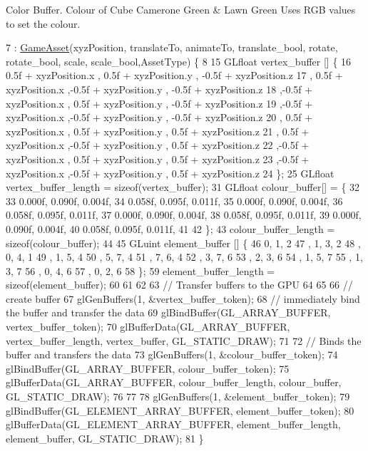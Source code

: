 Color Buffer. Colour of Cube Camerone Green \& Lawn Green Uses R\+G\+B values to set the colour.
\begin{DoxyCode}
7 : \hyperlink{class_game_asset_a9de932075d9b4263e7fb24fbfd163a61}{GameAsset}(xyzPosition, translateTo, animateTo, translate\_bool, rotate, rotate\_bool, scale, 
      scale\_bool,AssetType) \{
8 
15   GLfloat vertex\_buffer [] \{
16       0.5f + xyzPosition.x  , 0.5f + xyzPosition.y  , -0.5f + xyzPosition.z
17     , 0.5f + xyzPosition.x  ,-0.5f + xyzPosition.y  , -0.5f + xyzPosition.z
18     ,-0.5f + xyzPosition.x  , 0.5f + xyzPosition.y  , -0.5f + xyzPosition.z
19     ,-0.5f + xyzPosition.x  ,-0.5f + xyzPosition.y  , -0.5f + xyzPosition.z
20     , 0.5f + xyzPosition.x  , 0.5f + xyzPosition.y  ,  0.5f + xyzPosition.z
21     , 0.5f + xyzPosition.x  ,-0.5f + xyzPosition.y  ,  0.5f + xyzPosition.z
22     ,-0.5f + xyzPosition.x  , 0.5f + xyzPosition.y  ,  0.5f + xyzPosition.z
23     ,-0.5f + xyzPosition.x  ,-0.5f + xyzPosition.y  ,  0.5f + xyzPosition.z
24   \};
25   GLfloat vertex\_buffer\_length = \textcolor{keyword}{sizeof}(vertex\_buffer);
31   GLfloat colour\_buffer[] = \{
32 
33      0.000f, 0.090f, 0.004f, 
34      0.058f, 0.095f, 0.011f,
35      0.000f, 0.090f, 0.004f,
36      0.058f, 0.095f, 0.011f,
37      0.000f, 0.090f, 0.004f,
38      0.058f, 0.095f, 0.011f,
39      0.000f, 0.090f, 0.004f,
40      0.058f, 0.095f, 0.011f,
41 
42   \};
43  colour\_buffer\_length = \textcolor{keyword}{sizeof}(colour\_buffer);
44   
45   GLuint element\_buffer []  \{
46       0, 1, 2   
47     , 1, 3, 2
48     , 0, 4, 1   
49     , 1, 5, 4   
50     , 5, 7, 4   
51     , 7, 6, 4   
52     , 3, 7, 6   
53     , 2, 3, 6   
54     , 1, 5, 7   
55     , 1, 3, 7   
56     , 0, 4, 6   
57     , 0, 2, 6   
58   \};
59   element\_buffer\_length = \textcolor{keyword}{sizeof}(element\_buffer);
60 
61 
62 
63   \textcolor{comment}{// Transfer buffers to the GPU}
64 
65 
66   \textcolor{comment}{// create buffer}
67   glGenBuffers(1, &vertex\_buffer\_token);
68   \textcolor{comment}{// immediately bind the buffer and transfer the data}
69   glBindBuffer(GL\_ARRAY\_BUFFER, vertex\_buffer\_token);
70   glBufferData(GL\_ARRAY\_BUFFER, vertex\_buffer\_length, vertex\_buffer, GL\_STATIC\_DRAW);
71 
72   \textcolor{comment}{// Binds the buffer and transfers the data}
73   glGenBuffers(1, &colour\_buffer\_token);
74   glBindBuffer(GL\_ARRAY\_BUFFER, colour\_buffer\_token);
75   glBufferData(GL\_ARRAY\_BUFFER, colour\_buffer\_length, colour\_buffer, GL\_STATIC\_DRAW);
76 
77 
78   glGenBuffers(1, &element\_buffer\_token);
79   glBindBuffer(GL\_ELEMENT\_ARRAY\_BUFFER, element\_buffer\_token);
80   glBufferData(GL\_ELEMENT\_ARRAY\_BUFFER, element\_buffer\_length, element\_buffer, GL\_STATIC\_DRAW);
81 \}
\end{DoxyCode}
\hypertarget{class_leaves_asset_ae98d43a307f4c75cc8a661f0b36a213a}{}
